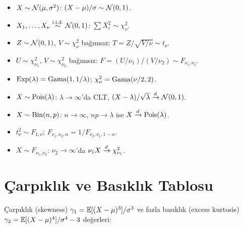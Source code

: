 \begin{itemize}
  \item $X\sim\mathcal{N}(\mu,\sigma^2)$: $(X-\mu)/\sigma\sim\mathcal{N}(0,1)$.
  \item $X_1,\ldots,X_\nu\overset{\text{i.i.d.}}{\sim}\mathcal{N}(0,1)$: $\sum X_i^2\sim\chi^2_\nu$.
  \item $Z\sim\mathcal{N}(0,1)$, $V\sim\chi^2_\nu$ bağımsız: $T=Z/\sqrt{V/\nu}\sim t_\nu$.
  \item $U\sim\chi^2_{\nu_1}$, $V\sim\chi^2_{\nu_2}$ bağımsız: $F=(U/\nu_1)/(V/\nu_2)\sim F_{\nu_1,\nu_2}$.
  \item $\operatorname{Exp}(\lambda)=\operatorname{Gama}(1,1/\lambda)$; $\chi^2_\nu=\operatorname{Gama}(\nu/2,2)$.
  \item $X\sim\operatorname{Pois}(\lambda)$: $\lambda\to\infty$'da CLT, $(X-\lambda)/\sqrt{\lambda}\xrightarrow{d}\mathcal{N}(0,1)$.
  \item $X\sim\operatorname{Bin}(n,p)$: $n\to\infty$, $np\to\lambda$ ise $X\xrightarrow{d}\operatorname{Pois}(\lambda)$.
  \item $t_\nu^2\sim F_{1,\nu}$; $F_{\nu_1,\nu_2,\alpha}=1/F_{\nu_2,\nu_1,1-\alpha}$.
  \item $X\sim F_{\nu_1,\nu_2}$: $\nu_2\to\infty$'da $\nu_1 X\xrightarrow{d}\chi^2_{\nu_1}$.
\end{itemize}

\section{Çarpıklık ve Basıklık Tablosu}
\label{app:carpiklik_basiklik}

Çarpıklık (skewness) $\gamma_1 = \mathbb{E}[(X-\mu)^3]/\sigma^3$ ve fazla basıklık (excess kurtosis) $\gamma_2 = \mathbb{E}[(X-\mu)^4]/\sigma^4 - 3$ değerleri:

